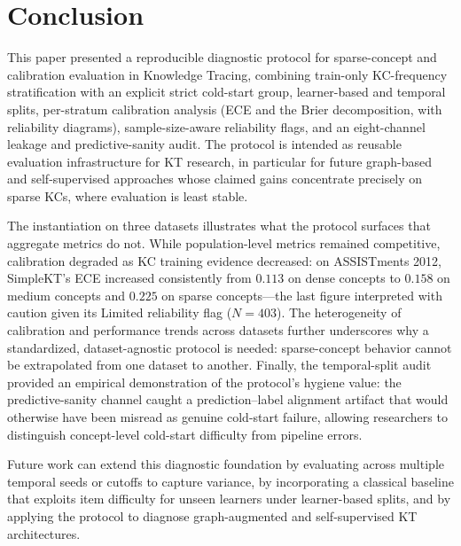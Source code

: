 \section{Conclusion}
\label{sec:conclusion}
This paper presented a reproducible diagnostic protocol for sparse-concept and calibration evaluation in Knowledge Tracing, combining train-only KC-frequency stratification with an explicit strict cold-start group, learner-based and temporal splits, per-stratum calibration analysis (ECE and the Brier decomposition, with reliability diagrams), sample-size-aware reliability flags, and an eight-channel leakage and predictive-sanity audit. The protocol is intended as reusable evaluation infrastructure for KT research, in particular for future graph-based and self-supervised approaches whose claimed gains concentrate precisely on sparse KCs, where evaluation is least stable.

The instantiation on three datasets illustrates what the protocol surfaces that aggregate metrics do not. While population-level metrics remained competitive, calibration degraded as KC training evidence decreased: on ASSISTments 2012, SimpleKT's ECE increased consistently from $0.113$ on dense concepts to $0.158$ on medium concepts and $0.225$ on sparse concepts---the last figure interpreted with caution given its Limited reliability flag ($N = 403$). The heterogeneity of calibration and performance trends across datasets further underscores why a standardized, dataset-agnostic protocol is needed: sparse-concept behavior cannot be extrapolated from one dataset to another. Finally, the temporal-split audit provided an empirical demonstration of the protocol's hygiene value: the predictive-sanity channel caught a prediction--label alignment artifact that would otherwise have been misread as genuine cold-start failure, allowing researchers to distinguish concept-level cold-start difficulty from pipeline errors.

Future work can extend this diagnostic foundation by evaluating across multiple temporal seeds or cutoffs to capture variance, by incorporating a classical baseline that exploits item difficulty for unseen learners under learner-based splits, and by applying the protocol to diagnose graph-augmented and self-supervised KT architectures.
